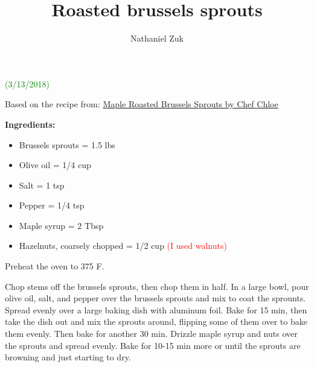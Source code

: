 \documentclass[11pt]{article}
\title{Roasted brussels sprouts}
\author{Nathaniel Zuk}
\begin{document}
\maketitle

\textcolor{green}{(3/13/2018)}

Based on the recipe from: \href{http://chefchloe.com/recipes/on-the-side/maple-roasted-brussels-sprouts-with-toasted-hazelnuts.html}{Maple Roasted Brussels Sprouts by Chef Chloe}

\textbf{Ingredients:}

\begin{itemize}
\item Brussels sprouts = 1.5 lbs
\item Olive oil = 1/4 cup
\item Salt = 1 tsp
\item Pepper = 1/4 tsp
\item Maple syrup = 2 Tbsp
\item Hazelnuts, coarsely chopped = 1/2 cup \textcolor{red}{(I used walnuts)}
\end{itemize}

Preheat the oven to 375 F.

Chop stems off the brussels sprouts, then chop them in half.  In a large bowl, pour olive oil, salt, and pepper over the brussels sprouts and mix to coat the sprounts.  Spread evenly over a large baking dish with aluminum foil.  Bake for 15 min, then take the dish out and mix the sprouts around, flipping some of them over to bake them evenly.  Then bake for another 30 min.  Drizzle maple syrup and nuts over the sprouts and spread evenly.  Bake for 10-15 min more or until the sprouts are browning and just starting to dry.
\end{document}
